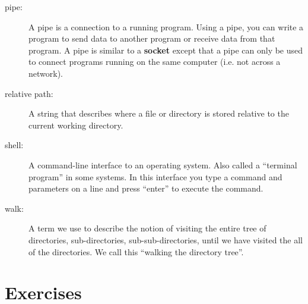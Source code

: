 \documentclass[10pt]{book}
\begin{document}
\begin{description}
\item[pipe:] A pipe is a connection to a running program.  Using
a pipe, you can write a program to send data to another program
or receive data from that program.  A pipe is similar to a 
{\bf socket} except that a pipe can only be used to 
connect programs running on the same computer (i.e. not
across a network).

\item[relative path:] A string that describes where a file or
directory is stored relative to the current working 
directory.

\item[shell:] A command-line interface to an operating system.
Also called a ``terminal program'' in some systems. In this interface
you type a command and parameters on a line and press ``enter''
to execute the command.

\item[walk:] A term we use to describe the notion of visiting
the entire tree of directories, sub-directories, sub-sub-directories, 
until we have visited the all of the directories.  We call this
``walking the directory tree''.

\end{description}


\section{Exercises}
\end{document}
